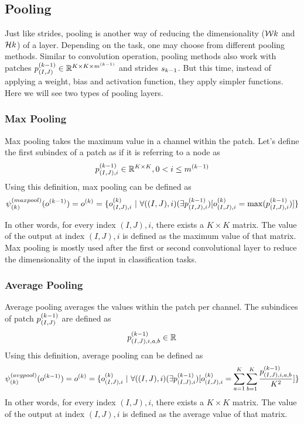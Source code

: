 \subsection{Pooling}
Just like strides, pooling is another way of reducing the dimensionality ($\mathcal{W}{k}$ and $\mathcal{H}{k}$) of a layer. Depending on the task, one may choose from different pooling methods. Similar to convolution operation, pooling methods also work with patches $p^{(k-1)}_{(I,J)} \in \mathbb{R}^{K \times K \times m^{(k-1)}}$ and strides $s_{k-1}$. But this time, instead of applying a weight, bias and activation function, they apply simpler functions. Here we will see two types of pooling layers.

\subsubsection{Max Pooling}
Max pooling takes the maximum value in a channel within the patch. Let's define the first subindex of a patch as if it is referring to a node as
$$ p^{(k-1)}_{(I,J),i} \in \mathbb{R}^{K \times K}, 0 < i \leq m^{(k-1)} $$
Using this definition, max pooling can be defined as
$$ \psi^{(maxpool)}_{(k)}(o^{(k-1)}) = o^{(k)} = \{ o^{(k)}_{(I,J),i} \ | \ \forall ((I,J),i) (\exists p^{(k-1)}_{(I,J),i}) [o^{(k)}_{(I,J),i} = \max(p^{(k-1)}_{(I,J),i})]  \}  $$

In other words, for every index $(I,J),i$, there exists a $K \times K$ matrix. The value of the output at index $(I,J),i$ is defined as the maximum value of that matrix. Max pooling is mostly used after the first or second convolutional layer to reduce the dimensionality of the input in classification tasks.

\subsubsection{Average Pooling}
Average pooling averages the values within the patch per channel. The subindices of patch $p^{(k-1)}_{(I,J)}$ are defined as
$$ p^{(k-1)}_{(I,J),i,a,b} \in \mathbb{R}^{} $$
Using this definition, average pooling can be defined as
$$ \psi^{(avgpool)}_{(k)}(o^{(k-1)}) = o^{(k)} = \{o^{(k)}_{(I,J),i}  \ | \ \forall ((I,J),i) (\exists p^{(k-1)}_{(I,J),i}) [o^{(k)}_{(I,J),i} = \sum_{a=1}^{K}\sum_{b=1}^{K}\frac{p^{(k-1)}_{(I,J),i,a,b}}{K^2} ]\} $$
In other words, for every index $(I,J),i$, there exists a $K \times K$ matrix. The value of the output at index $(I,J),i$ is defined as the average value of that matrix. 

